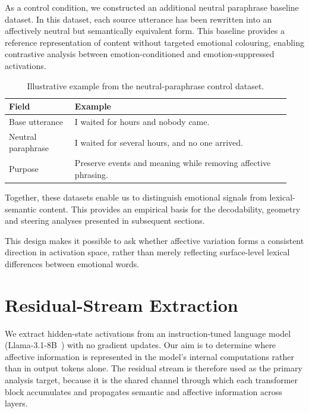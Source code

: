 As a control condition, we constructed an additional neutral paraphrase baseline dataset. In this dataset, each source utterance has been rewritten into an affectively neutral but semantically equivalent form. This baseline provides a reference representation of content without targeted emotional colouring, enabling contrastive analysis between emotion-conditioned and emotion-suppressed activations. \par

\begin{table}[H]
\centering
\small
\begin{tabular}{p{0.22\linewidth} p{0.72\linewidth}}
\toprule
\textbf{Field} & \textbf{Example} \\
\midrule
Base utterance & I waited for hours and nobody came. \\
Neutral paraphrase & I waited for several hours, and no one arrived. \\
Purpose & Preserve events and meaning while removing affective phrasing. \\
\bottomrule
\end{tabular}
\caption{Illustrative example from the neutral-paraphrase control dataset.}
\label{tab:neutral_rewrite_example}
\end{table}

Together, these datasets enable us to distinguish emotional signals from lexical-semantic content. This provides an empirical basis for the decodability, geometry and steering analyses presented in subsequent sections.\par

This design makes it possible to ask whether affective variation forms a consistent direction in activation space, rather than merely reflecting surface-level lexical differences between emotional words.\par

\section{Residual-Stream Extraction}

We extract hidden-state activations from an instruction-tuned language model (Llama-3.1-8B~\cite{meta2024llama318b}) with no gradient updates. Our aim is to determine where affective information is represented in the model's internal computations rather than in output tokens alone. The residual stream is therefore used as the primary analysis target, because it is the shared channel through which each transformer block accumulates and propagates semantic and affective information across layers.

